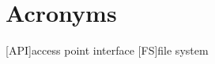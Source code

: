 \chapter*{Acronyms}
\begin{acronym}
    [API]{access point interface}
    [FS]{file system}
\end{acronym}
